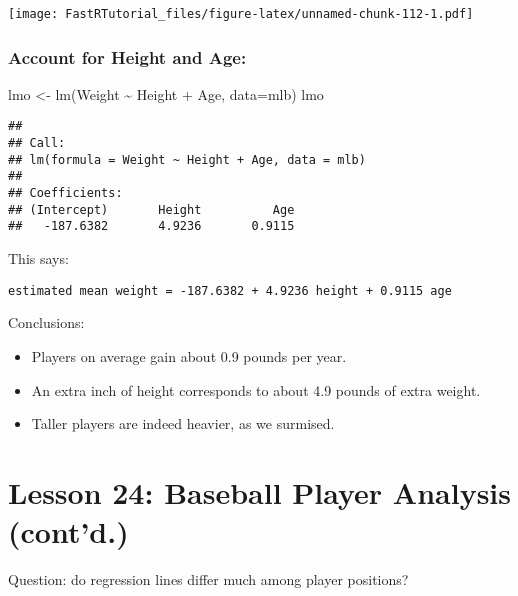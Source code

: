 \documentclass[
]{article}
\newenvironment{Shaded}{\begin{snugshade}}{\end{snugshade}}
\newcommand{\AttributeTok}[1]{\textcolor[rgb]{0.77,0.63,0.00}{#1}}
\newcommand{\FunctionTok}[1]{\textcolor[rgb]{0.00,0.00,0.00}{#1}}
\newcommand{\NormalTok}[1]{#1}
\newcommand{\OtherTok}[1]{\textcolor[rgb]{0.56,0.35,0.01}{#1}}
\newcommand{\SpecialCharTok}[1]{\textcolor[rgb]{0.00,0.00,0.00}{#1}}
\begin{document}
\texttt{[image: FastRTutorial\_files/figure-latex/unnamed-chunk-112-1.pdf]}

\hypertarget{account-for-height-and-age}{%
\subsubsection{Account for Height and
Age:}\label{account-for-height-and-age}}

\begin{Shaded}
\begin{Highlighting}[]
\NormalTok{lmo }\OtherTok{\textless{}{-}} \FunctionTok{lm}\NormalTok{(Weight }\SpecialCharTok{\textasciitilde{}}\NormalTok{ Height }\SpecialCharTok{+}\NormalTok{ Age, }\AttributeTok{data=}\NormalTok{mlb)}
\NormalTok{lmo}
\end{Highlighting}
\end{Shaded}

\begin{verbatim}
## 
## Call:
## lm(formula = Weight ~ Height + Age, data = mlb)
## 
## Coefficients:
## (Intercept)       Height          Age  
##   -187.6382       4.9236       0.9115
\end{verbatim}

This says:

\begin{verbatim}
estimated mean weight = -187.6382 + 4.9236 height + 0.9115 age
\end{verbatim}

Conclusions:

\begin{itemize}
\item
  Players on average gain about 0.9 pounds per year.
\item
  An extra inch of height corresponds to about 4.9 pounds of extra
  weight.
\item
  Taller players are indeed heavier, as we surmised.
\end{itemize}

\hypertarget{lesson-24-baseball-player-analysis-contd.}{%
\section{Lesson 24: Baseball Player Analysis
(cont'd.)}\label{lesson-24-baseball-player-analysis-contd.}}

Question: do regression lines differ much among player positions?

\begin{Shaded}
\end{Shaded}
\end{document}
